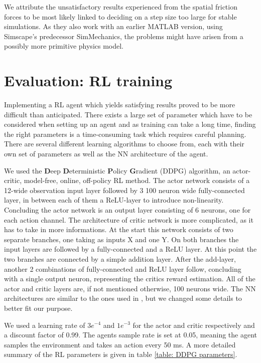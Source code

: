 We attribute the unsatisfactory results \cite{thilderkvist2015motion}  experienced from the spatial friction forces to be most likely linked to deciding on a step size too large for stable simulations.
As they also work with an earlier MATLAB version, using Simscape's predecessor SimMechanics, the problems might have arisen from a possibly more primitive physics model.


\section{Evaluation: RL training}
Implementing a RL agent which yields satisfying results proved to be more difficult than anticipated.
There exists a large set of parameter which have to be considered when setting up an agent and as training can take a long time, finding the right parameters is a time-consuming task which requires careful planning.
There are several different learning algorithms to choose from, each with their own set of parameters as well as the NN architecture of the agent. 

We used the \textbf{D}eep \textbf{D}eterministic \textbf{P}olicy \textbf{G}radient (DDPG) algorithm, an actor-critic, model-free, online, off-policy RL method.
The actor network consists of a 12-wide observation input layer followed by 3 100 neuron wide fully-connected layer, in between each of them a ReLU-layer to introduce non-linearity.
Concluding the actor network is an output layer consisting of 6 neurons, one for each action channel.
The architecture of critic network is more complicated, as it has to take in more informations.
At the start this network consists of two separate branches, one taking as inputs X and one Y.
On both branches the input layers are followed by a fully-connected and a ReLU layer.
At this point the two branches are connected by a simple addition layer.
After the add-layer, another 2 combinations of fully-connected and ReLU layer follow, concluding with a single output neuron, representing the critics reward estimation.
All of the actor and critic layers are, if not mentioned otherwise, 100 neurons wide.
The NN architectures are similar to the ones used in \parencite{AUTHOR}, but we changed some details to better fit our purpose.

We used a learning rate of $3e^{-4}$ and $1e^{-3}$ for the actor and critic respectively and a discount factor of 0.99.
The agents sample rate is set at 0.05, meaning the agent samples the environment and takes an action every 50 ms.
A more detailed summary of the RL parameters is given in table \ref{table: DDPG parameters}.


